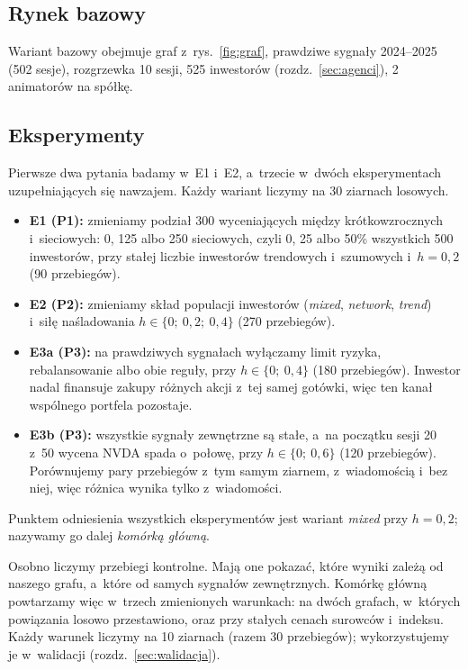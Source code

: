 \documentclass[11pt,a4paper]{article}
\newcommand{\cell}[1]{\textit{#1}}
\begin{document}
\subsection{Rynek bazowy}
Wariant bazowy obejmuje graf z~rys.~\ref{fig:graf}, prawdziwe sygnały 2024--2025 (502 sesje), rozgrzewka 10 sesji,
525 inwestorów (rozdz.~\ref{sec:agenci}), 2 animatorów na spółkę.

\subsection{Eksperymenty}\label{sec:eksperymenty}
Pierwsze dwa pytania badamy w~E1 i~E2, a~trzecie w~dwóch eksperymentach uzupełniających się nawzajem.
Każdy wariant liczymy na 30 ziarnach losowych.
\begin{itemize}[label=--]
  \item \textbf{E1 (P1):} zmieniamy podział 300 wyceniających między krótkowzrocznych i~sieciowych: 0, 125 albo 250
  sieciowych, czyli 0, 25 albo 50\% wszystkich 500 inwestorów, przy stałej liczbie inwestorów trendowych
  i~szumowych i~$h = 0{,}2$ (90 przebiegów).
  \item \textbf{E2 (P2):} zmieniamy skład populacji inwestorów (\cell{mixed}, \cell{network}, \cell{trend})
  i~siłę naśladowania $h \in \{0;\ 0{,}2;\ 0{,}4\}$ (270 przebiegów).
  \item \textbf{E3a (P3):} na prawdziwych sygnałach wyłączamy limit ryzyka, rebalansowanie albo obie reguły,
  przy $h \in \{0;\ 0{,}4\}$ (180 przebiegów). Inwestor nadal finansuje zakupy różnych akcji z~tej samej gotówki, więc
  ten kanał wspólnego portfela pozostaje.
  \item \textbf{E3b (P3):} wszystkie sygnały zewnętrzne są stałe, a~na początku sesji 20 z~50 wycena NVDA spada
  o~połowę, przy $h \in \{0;\ 0{,}6\}$ (120 przebiegów). Porównujemy pary przebiegów z~tym samym ziarnem, z~wiadomością
  i~bez niej, więc różnica wynika tylko z~wiadomości.
\end{itemize}
Punktem odniesienia wszystkich eksperymentów jest wariant \cell{mixed} przy $h = 0{,}2$; nazywamy go dalej
\emph{komórką główną}.

Osobno liczymy przebiegi kontrolne. Mają one pokazać, które wyniki zależą od naszego grafu, a~które od samych
sygnałów zewnętrznych. Komórkę główną powtarzamy więc w~trzech zmienionych warunkach: na dwóch grafach, w~których
powiązania losowo przestawiono, oraz przy stałych cenach surowców i~indeksu. Każdy warunek liczymy na 10 ziarnach
(razem 30 przebiegów); wykorzystujemy je w~walidacji (rozdz.~\ref{sec:walidacja}).
\end{document}
